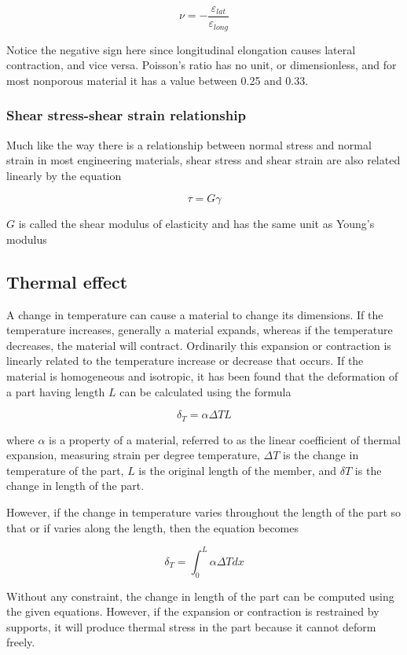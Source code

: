 \documentclass[a4paper,openany,nobib]{tufte-book}
\begin{document}
$$\nu  =  - \frac{\varepsilon _{lat}}{\varepsilon _{long}}$$

Notice the negative sign here since longitudinal elongation causes
lateral contraction, and vice versa. Poisson's ratio has no unit, or
dimensionless, and for most nonporous material it has a value between
0.25 and 0.33.

\subsubsection{Shear stress-shear strain relationship}
\label{shear-stress-shear-strain-relationship}
Much like the way there is a relationship between normal stress and
normal strain in most engineering materials, shear stress and shear
strain are also related linearly by the equation

$$\tau  = G\gamma$$

\(G\) is called the shear modulus of elasticity and has the same unit as
Young's modulus

\subsection{Thermal effect}
\label{thermal-effect}
A change in temperature can cause a material to change its dimensions.
If the temperature increases, generally a material expands, whereas if
the temperature decreases, the material will contract. Ordinarily this
expansion or contraction is linearly related to the temperature increase
or decrease that occurs. If the material is homogeneous and isotropic,
it has been found that the deformation of a part having length \(L\) can
be calculated using the formula

$$\delta _T = \alpha \Delta TL$$

where \(\alpha\) is a property of a material, referred to as the linear
coefficient of thermal expansion, measuring strain per degree
temperature, \(\Delta T\) is the change in temperature of the part, \(L\) is
the original length of the member, and \(\delta T\) is the change in
length of the part.

However, if the change in temperature varies throughout the length of
the part so that or if varies along the length, then the equation
becomes

$$\delta _T = \int_0^L \alpha \Delta Tdx$$

Without any constraint, the change in length of the part can be computed
using the given equations. However, if the expansion or contraction is
restrained by supports, it will produce thermal stress in the part
because it cannot deform freely.
\end{document}
